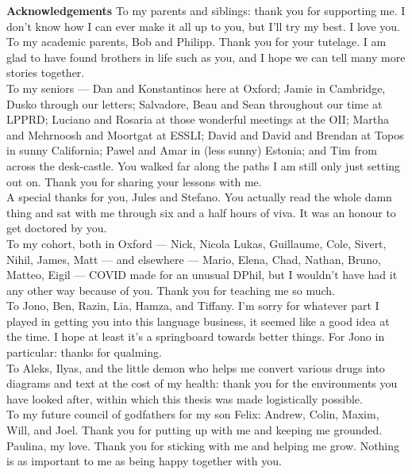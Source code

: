 \clearpage
\newpage
\vfill
\begin{myboxB}
\textbf{Acknowledgements}
To my parents and siblings: thank you for supporting me. I don't know how I can ever make it all up to you, but I'll try my best. I love you.\\

To my academic parents, Bob and Philipp. Thank you for your tutelage. I am glad to have found brothers in life such as you, and I hope we can tell many more stories together.\\

To my seniors --- Dan and Konstantinos here at Oxford; Jamie in Cambridge, Dusko through our letters; Salvadore, Beau and Sean throughout our time at LPPRD; Luciano and Rosaria at those wonderful meetings at the OII; Martha and Mehrnoosh and Moortgat at ESSLI; David and David and Brendan at Topos in sunny California; Pawel and Amar in (less sunny) Estonia; and Tim from across the desk-castle. You walked far along the paths I am still only just setting out on. Thank you for sharing your lessons with me.\\

A special thanks for you, Jules and Stefano. You actually read the whole damn thing and sat with me through six and a half hours of viva. It was an honour to get doctored by you.\\

To my cohort, both in Oxford --- Nick, Nicola Lukas, Guillaume, Cole, Sivert, Nihil, James, Matt --- and elsewhere --- Mario, Elena, Chad, Nathan, Bruno, Matteo, Eigil --- COVID made for an unusual DPhil, but I wouldn't have had it any other way because of you. Thank you for teaching me so much.\\

To Jono, Ben, Razin, Lia, Hamza, and Tiffany. I'm sorry for whatever part I played in getting you into this language business, it seemed like a good idea at the time. I hope at least it's a springboard towards better things. For Jono in particular: thanks for qualming.\\

To Aleks, Ilyas, and the little demon who helps me convert various drugs into diagrams and text at the cost of my health: thank you for the environments you have looked after, within which this thesis was made logistically possible.\\

To my future council of godfathers for my son Felix: Andrew, Colin, Maxim, Will, and Joel. Thank you for putting up with me and keeping me grounded.\\

Paulina, my love. Thank you for sticking with me and helping me grow. Nothing is as important to me as being happy together with you.
\end{myboxB}
